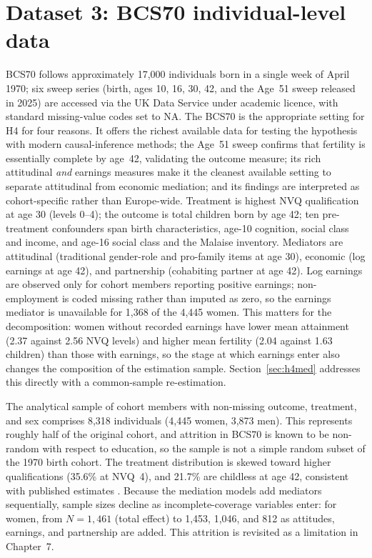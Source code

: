 \documentclass[12pt,a4paper]{report}
\begin{document}
\section{Dataset 3: BCS70 individual-level data}
BCS70 follows approximately 17,000 individuals born in a single week of April 1970; six sweep
series (birth, ages 10, 16, 30, 42, and the Age~51 sweep released in 2025) are accessed via the UK
Data Service under academic licence, with standard missing-value codes set to NA. The BCS70 is the
appropriate setting for H4 for four reasons. It offers the richest available data for testing the
hypothesis with modern causal-inference methods; the Age~51 sweep confirms that fertility is
essentially complete by age~42, validating the outcome measure; its rich attitudinal \emph{and}
earnings measures make it the cleanest available setting to separate attitudinal from economic
mediation; and its findings are interpreted as cohort-specific rather than Europe-wide. Treatment is
highest NVQ qualification at age 30 (levels 0--4); the outcome is total children born by age 42;
ten pre-treatment confounders span birth
characteristics, age-10 cognition, social class and income, and age-16 social class and the
Malaise inventory. Mediators are attitudinal (traditional gender-role and pro-family items at age
30), economic (log earnings at age 42), and partnership (cohabiting partner at age 42). Log earnings
are observed only for cohort members reporting positive earnings; non-employment is coded missing
rather than imputed as zero, so the earnings mediator is unavailable for 1{,}368 of the 4{,}445 women.
This matters for the decomposition: women without recorded earnings have lower mean attainment (2.37
against 2.56 NVQ levels) and higher mean fertility (2.04 against 1.63 children) than those with
earnings, so the stage at which earnings enter also changes the composition of the estimation sample.
Section~\ref{sec:h4med} addresses this directly with a common-sample re-estimation.

The analytical sample of cohort members with non-missing outcome, treatment, and sex comprises
8,318 individuals (4,445 women, 3,873 men). This represents roughly half of the original cohort,
and attrition in BCS70 is known to be non-random with respect to education, so the sample is not a
simple random subset of the 1970 birth cohort. The treatment distribution is skewed toward higher
qualifications (35.6\% at NVQ~4), and 21.7\% are childless at age 42, consistent with published
estimates \citep{berrington2017}. Because the mediation models add mediators sequentially, sample
sizes decline as incomplete-coverage variables enter: for women, from $N=1{,}461$ (total effect) to
1{,}453, 1{,}046, and 812 as attitudes, earnings, and partnership are added. This attrition is
revisited as a limitation in Chapter~7.
\end{document}
